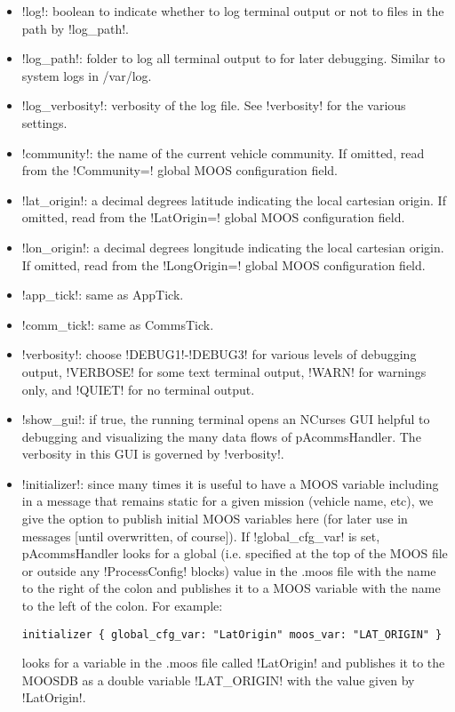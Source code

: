\begin{itemize}
\item !log!: boolean to indicate whether to log terminal output or not to files in the path by !log_path!.
\item !log_path!: folder to log all terminal output to for later debugging. Similar to system logs in /var/log.
\item !log_verbosity!: verbosity of the log file. See !verbosity! for the various settings.
\item !community!: the name of the current vehicle community. If omitted, read from the !Community=! global MOOS configuration field.
\item !lat_origin!: a decimal degrees latitude indicating the local cartesian origin. If omitted, read from the !LatOrigin=! global MOOS configuration field.
\item !lon_origin!: a decimal degrees longitude indicating the local cartesian origin. If omitted, read from the !LongOrigin=! global MOOS configuration field.
\item !app_tick!: same as AppTick.
\item !comm_tick!: same as CommsTick.
\item !verbosity!: choose !DEBUG1!-!DEBUG3! for various levels of debugging output, !VERBOSE! for some text terminal output, !WARN! for warnings only, and !QUIET! for no terminal output.
\item !show_gui!: if true, the running terminal opens an NCurses GUI helpful to debugging and visualizing the many data flows of pAcommsHandler. The verbosity in this GUI is governed by !verbosity!.
\item !initializer!: since many times it is useful to have a MOOS variable including in a message that remains static for a given mission (vehicle name, etc), we give the option to publish initial MOOS variables here (for later use in messages [until overwritten, of course]). If !global_cfg_var! is set, pAcommsHandler looks for a global (i.e. specified at the top of the MOOS file or outside any !ProcessConfig! blocks) value in the .moos file with the name to the right of the colon and publishes it to a MOOS variable with the name to the left of the colon. For example:
\begin{verbatim}
initializer { global_cfg_var: "LatOrigin" moos_var: "LAT_ORIGIN" } 
\end{verbatim}
\resetbvlinenumber
looks for a variable in the .moos file called !LatOrigin! and publishes it to the MOOSDB as a double variable !LAT_ORIGIN! with the value given by !LatOrigin!.
\end{itemize}



